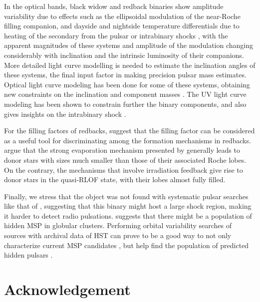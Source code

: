 \documentclass[fleqn,usenatbib,useAMS,letters]{mnras}
\begin{document}
 In the optical bands, black widow and redback binaries show amplitude variability due to effects such as the ellipsoidal modulation of the near-Roche filling companion, and dayside and nightside temperature differentials due to heating of the secondary from the pulsar or intrabinary shocks \cite[e.g.][]{Cho2018}, with the apparent magnitudes of these systems and amplitude of the modulation changing considerably with inclination and the intrinsic luminosity of their companions. More detailed light curve modelling is needed to estimate the inclination angles of these systems, the final input factor in making precision pulsar mass estimates. Optical light curve modeling has been done for some of these systems, obtaining new constraints on the inclination and component masses \citep{Thorstensen2005,LilianaPulsar2018,Cho2018,Strader2019Redbacks}. The UV light curve modeling has been shown to constrain further the binary components, and also gives insights on the intrabinary shock \citep[e.g.,][]{LilianaPulsar2018}.
 



For the filling factors of redbacks, \cite{devitobenvenuto2020} suggest that the filling factor can be considered as a useful tool for discriminating among the formation mechanisms in redbacks. \cite{devitobenvenuto2020} argue that the strong evaporation mechanism presented by \cite{ChenFormationRedback2013} generally leads to  donor stars with sizes much smaller than those of their associated Roche lobes. On the contrary, the mechanisms that involve irradiation feedback \citep{irradiation2004,Benvenuto2014} give rise to donor stars in the quasi-RLOF state, with their lobes almost fully filled. 


Finally, we stress that the object was not found with systematic pulsar searches like that of  \cite{DamicoU12,damico2001discovery}, suggesting that this binary might host a large shock region, making it harder to detect radio pulsations. \cite{Tavani91} suggests that there might be a population of hidden MSP in globular clusters. Performing orbital variability searches of sources with archival data of HST can prove to be a good way to not only characterize current MSP candidates \citep[e.g.][]{Liliana201847Tuc}, but help find the population of predicted hidden pulsars \citep{CoryPaper,Urquhart20}.



\section{Acknowledgement}
\end{document}
